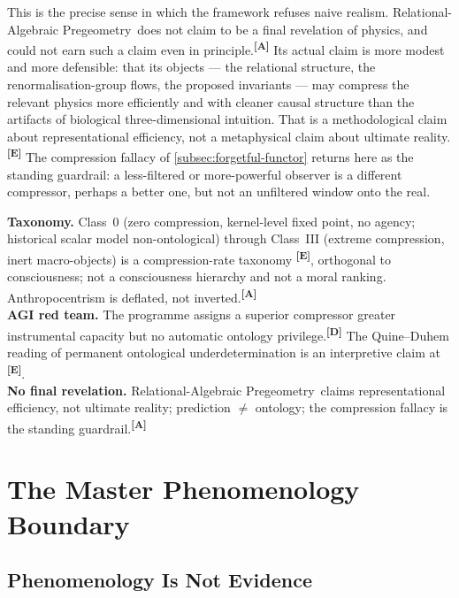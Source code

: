 \documentclass[12pt,a4paper,twoside]{article}
\theoremstyle{plain}
\theoremstyle{definition}
\theoremstyle{remark}
\newcommand{\ProjectShort}{Relational-Algebraic Pregeometry}
\newcommand{\RAP}{\ProjectShort}
\newcommand{\catmark}[1]{\textsuperscript{\textsf{\textbf{[#1]}}}}
\begin{document}
This is the precise sense in which the framework refuses naive realism.
\RAP\ does not claim to be a final revelation of physics, and could not
earn such a claim even in principle.\catmark{A} Its actual claim is more
modest and more defensible: that its objects --- the relational structure,
the renormalisation-group flows, the proposed invariants --- may compress
the relevant physics more efficiently and with cleaner causal structure
than the artifacts of biological three-dimensional intuition. That is a
methodological claim about representational efficiency, not a metaphysical
claim about ultimate reality.\catmark{E} The compression fallacy of
\cref{subsec:forgetful-functor} returns here as the standing guardrail: a
less-filtered or more-powerful observer is a different compressor, perhaps
a better one, but not an unfiltered window onto the real.

\begin{evidencebox}{}
\textbf{Taxonomy.} Class~0 (zero compression, kernel-level fixed point, no
agency; historical scalar model non-ontological) through Class~III (extreme compression, inert
macro-objects) is a compression-rate taxonomy \catmark{E}, orthogonal to
consciousness; not a consciousness hierarchy and not a moral ranking.
Anthropocentrism is deflated, not inverted.\catmark{A}\\[0.3em]
\textbf{AGI red team.} The programme assigns a superior compressor greater
instrumental capacity but no automatic ontology privilege.\catmark{D}
The Quine--Duhem reading of permanent ontological underdetermination is an
interpretive claim at \catmark{E}.\\[0.3em]
\textbf{No final revelation.} \RAP\ claims representational efficiency, not
ultimate reality; prediction $\neq$ ontology; the compression fallacy is
the standing guardrail.\catmark{A}
\end{evidencebox}

\newpage
\section{The Master Phenomenology Boundary}
\label{sec:phenomenology-boundary}

\subsection{Phenomenology Is Not Evidence}
\label{subsec:phenomenology-not-evidence}
\end{document}
